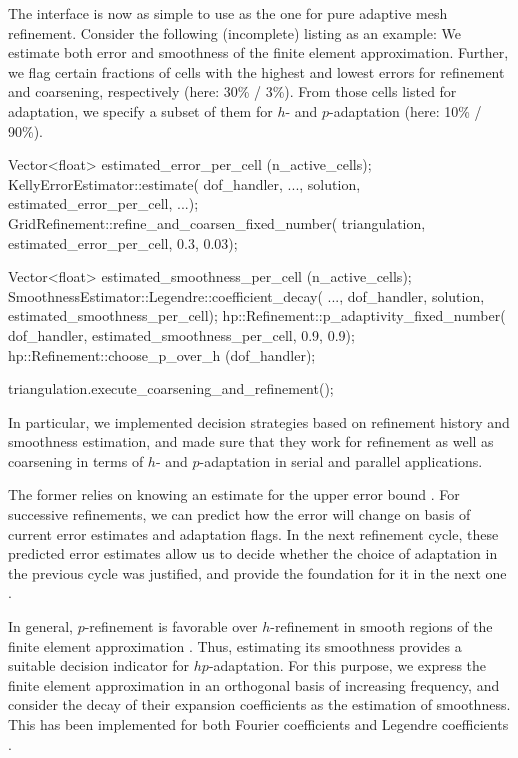 \documentclass{ansarticle-preprint}
\begin{document}
The interface is now as simple to use as the one for pure adaptive mesh refinement.
Consider the following (incomplete) listing as an example: We estimate both error and
smoothness of the finite element approximation. Further, we flag certain fractions of
cells with the highest and lowest errors for refinement and coarsening, respectively
(here: 30\% / 3\%). From those cells listed for adaptation, we specify a subset of them
for $h$- and $p$-adaptation (here: 10\% / 90\%).
\begin{c++}
Vector<float> estimated_error_per_cell (n_active_cells);
KellyErrorEstimator::estimate(
  dof_handler, ..., solution, estimated_error_per_cell, ...);
GridRefinement::refine_and_coarsen_fixed_number(
  triangulation, estimated_error_per_cell, 0.3, 0.03);

Vector<float> estimated_smoothness_per_cell (n_active_cells);
SmoothnessEstimator::Legendre::coefficient_decay(
  ..., dof_handler, solution, estimated_smoothness_per_cell);
hp::Refinement::p_adaptivity_fixed_number(
  dof_handler, estimated_smoothness_per_cell, 0.9, 0.9);
hp::Refinement::choose_p_over_h (dof_handler);

triangulation.execute_coarsening_and_refinement();
\end{c++}

In particular, we implemented decision strategies based on refinement history and
smoothness estimation, and made sure that they work for refinement as well as
coarsening in terms of $h$- and $p$-adaptation in serial and parallel applications.

The former relies on knowing an estimate for the upper error bound \cite[Thm.~3.4]{BabuskaSuri1990}.
For successive refinements, we can predict how the error will change on basis of
current error estimates and adaptation flags. In the next refinement cycle, these
predicted error estimates allow us to decide whether the choice of adaptation in
the previous cycle was justified, and provide the foundation for it in the next
one \cite{MelenkWohlmuth2001}.

In general, $p$-refinement is favorable over $h$-refinement in smooth regions of
the finite element approximation \cite[Thm.~3.4]{BabuskaSuri1990}. Thus, estimating
its smoothness provides a suitable decision indicator for $hp$-adaptation. For this
purpose, we express the finite element approximation in an orthogonal
basis of increasing frequency, and consider the decay of their expansion
coefficients as the estimation of smoothness. This has been implemented for both
Fourier coefficients \cite{BangerthKayserHerold2007} and Legendre coefficients
\cite{Mavriplis1994,HoustonSeniorSueli2003,HoustonSueli2005,EibnerMelenk2007}.
\end{document}
